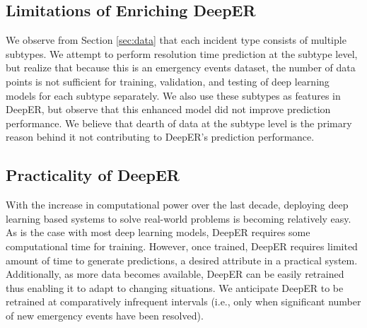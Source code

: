 \subsection{Limitations of Enriching DeepER}

We observe from Section \ref{sec:data} that each incident type consists of multiple subtypes. We attempt to perform resolution time prediction at the subtype level, but realize that because this is an emergency  events dataset, the number of data points  is not sufficient for training, validation, and testing of deep learning models for  each subtype separately. We also use these subtypes as features in DeepER, but observe that this enhanced model did not improve prediction performance. We believe that dearth of data at the subtype level is the primary reason behind it not contributing to DeepER's prediction performance.

\subsection{Practicality of DeepER}

With the increase in computational power over the last decade, deploying deep learning based systems to solve real-world problems is becoming relatively easy. As is the case with most deep learning models, DeepER requires some computational time for training. However, once trained, DeepER requires limited amount of  time to generate predictions, a desired attribute in a practical system. Additionally, as more data becomes available, DeepER can be easily retrained thus enabling it to adapt to changing situations. We anticipate DeepER to be retrained at comparatively infrequent intervals (i.e., only when significant number of new emergency events have been resolved).








